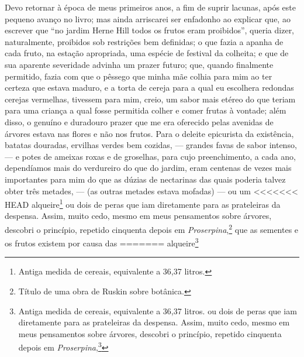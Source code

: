 {{{{{{{{{{{{{{{{{%
Devo retornar à época de meus primeiros anos, a fim de suprir
lacunas, após este pequeno avanço no livro; mas ainda arriscarei ser
enfadonho ao explicar que, ao escrever que ``no jardim Herne Hill todos
os frutos eram proibidos'', queria dizer, naturalmente, proibidos sob
restrições bem definidas; o que fazia a apanha de cada fruto, na estação
apropriada, uma espécie de festival da colheita; e que de sua aparente
severidade advinha um prazer futuro; que, quando finalmente permitido,
fazia com que o pêssego que minha mãe colhia para mim ao ter certeza que
estava maduro, e a torta de cereja para a qual eu escolhera redondas
cerejas vermelhas, tivessem para mim, creio, um sabor mais etéreo do que
teriam para uma criança a qual fosse permitida colher e comer frutas à
vontade; além disso, o genuíno e duradouro prazer que me era oferecido
pelas avenidas de árvores estava nas flores e não nos frutos. Para o
deleite epicurista da existência, batatas douradas, ervilhas verdes bem
cozidas, --- grandes favas de sabor intenso, --- e potes de ameixas roxas
e de groselhas, para cujo preenchimento, a cada ano, dependíamos mais do
verdureiro do que do jardim, eram centenas de vezes mais importantes
para mim do que as dúzias de nectarinas das quais poderia talvez obter
três metades, --- (as outras metades estava mofadas) --- ou um
<<<<<<< HEAD
alqueire\footnote{Antiga medida de cereais, equivalente a 36,37 litros.} ou dois de peras que iam diretamente para as
prateleiras da despensa. Assim, muito cedo, mesmo em meus pensamentos
sobre árvores, descobri o princípio, repetido cinquenta depois em
\textit{Proserpina},\footnote{Título de uma obra de Ruskin sobre botânica.} que as sementes e os frutos existem por causa das
=======
alqueire\footnote{Antiga medida de cereais, equivalente a 36,37 litros.
   ou dois de peras que iam diretamente para as
prateleiras da despensa. Assim, muito cedo, mesmo em meus pensamentos
sobre árvores, descobri o princípio, repetido cinquenta depois em
\textit{Proserpina},\footnote{Título de uma obra de Ruskin sobre botânica
   que as sementes e os frutos existem por causa das
>>>>>>> 7ef31cc2a6d5603f856fee4c85bc83700040648c
flores, e não as flores por causa dos frutos. A primeira alegria do ano
era a chegada da neve, a segunda, e fundamental, eram as amendoeiras em
flor, --- todos os outros jardins e bosques o seguiam alegremente numa
sequencia contínua de belas flores e folhas sombrosas; e, por muitos e
muitos anos, --- até que a vida se tornasse outono para mim, --- minha
maior prece à bondade celestial, nas estações floridas, era que a geada
poupasse as amendoeiras em flor.

}}}}}}}}}}}}}}}}}}}
